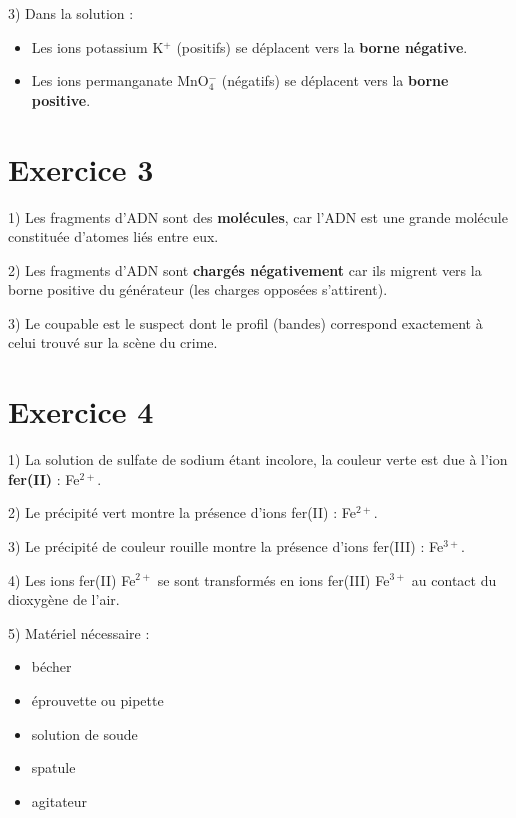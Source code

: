\documentclass[12pt]{article}
\begin{document}
3) Dans la solution :
\begin{itemize}
\item Les ions potassium K$^{+}$ (positifs) se déplacent vers la \textbf{borne négative}.
\item Les ions permanganate MnO$_4^{-}$ (négatifs) se déplacent vers la \textbf{borne positive}.
\end{itemize}

\bigskip
\section*{Exercice 3}

1) Les fragments d’ADN sont des \textbf{molécules}, car l’ADN est une grande molécule constituée d’atomes liés entre eux.

2) Les fragments d’ADN sont \textbf{chargés négativement} car ils migrent vers la borne positive du générateur (les charges opposées s’attirent).

3) Le coupable est le suspect dont le profil (bandes) correspond exactement à celui trouvé sur la scène du crime.

\bigskip
\section*{Exercice 4}

1) La solution de sulfate de sodium étant incolore, la couleur verte est due à l’ion \textbf{fer(II)} : Fe$^{2+}$.

2) Le précipité vert montre la présence d’ions fer(II) : Fe$^{2+}$.

3) Le précipité de couleur rouille montre la présence d’ions fer(III) : Fe$^{3+}$.


4) Les ions fer(II) Fe$^{2+}$ se sont transformés en ions fer(III) Fe$^{3+}$ 
au contact du dioxygène de l’air.

5) Matériel nécessaire :
\begin{itemize}
\item bécher
\item éprouvette ou pipette
\item solution de soude
\item spatule
\item agitateur
\end{itemize}
\end{document}
